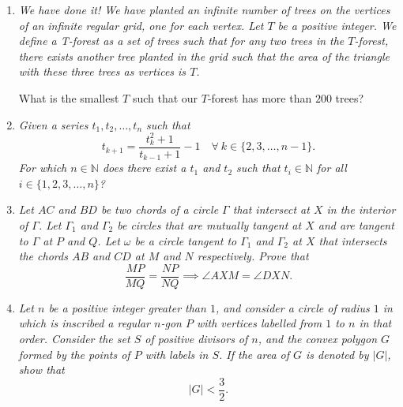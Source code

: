 \documentclass{article}
\begin{document}
\begin{enumerate}
\medskip
\item %
{\itshape We have done it! We have planted an infinite number of trees on the vertices of an infinite regular grid, one for each vertex. Let $T$ be a positive integer. 
We define a {\itshape T-forest} as a set of trees such that for any two trees in the $T$-forest, there exists another tree planted in the grid such that the area of the triangle with these three trees as vertices is $T$.

What is the smallest $T$ such that our $T$-forest has more than $200$ trees?}



\medskip
\item %
{\itshape Given a series $t_1, t_2, \dotsc, t_n$ such that 
\[ t_{k + 1} = \frac{t_k^2 + 1}{t_{k-1} + 1} - 1 \quad \forall \ k \in \{2, 3, \dots, n-1\}. \]
For which $n \in \mathbb{N}$ does there exist a $t_1$ and $t_2$ such that $t_i \in \mathbb{N}$ for all $i \in \{1, 2, 3, \dotsc, n\}$?}



\medskip
\item %
{\itshape Let $AC$ and $BD$ be two chords of a circle $\Gamma$ that intersect at $X$ in the interior of $\Gamma$.
Let $\Gamma_1$ and $\Gamma_2$ be circles that are mutually tangent at $X$ and are tangent to $\Gamma$ at $P$ and $Q$.
Let $\omega$ be a circle tangent to $\Gamma_1$ and $\Gamma_2$ at $X$ that intersects the chords $AB$ and $CD$ at $M$ and $N$ respectively.
Prove that
\[
	\frac{MP}{MQ} = \frac{NP}{NQ} \implies \angle AXM = \angle DXN.
\]}



\medskip
\item %
{\itshape Let $n$ be a positive integer greater than $1$, and consider a circle of radius $1$ in which is inscribed a regular $n$-gon $P$ with vertices labelled from $1$ to $n$ in that order.
Consider the set $S$ of positive divisors of $n$, and the convex polygon $G$ formed by the points of $P$ with labels in $S$.
If the area of $G$ is denoted by $|G|$, show that
\[ 
	|G| < \frac{3}{2}.
\]}


\end{enumerate}
\end{document}
